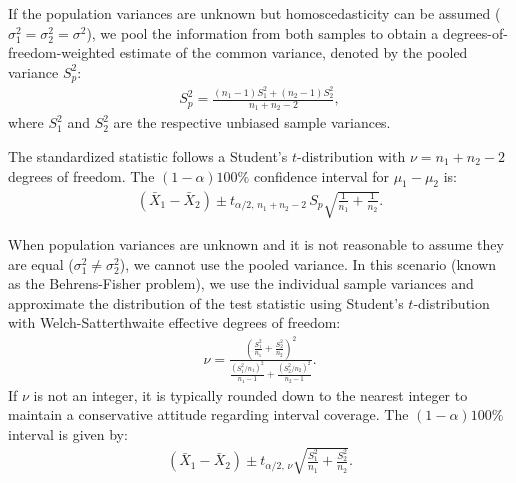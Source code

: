 \begin{teorema}
	If the population variances are unknown but homoscedasticity can be assumed ($\sigma_1^2 = \sigma_2^2 = \sigma^2$), we pool the information from both samples to obtain a degrees-of-freedom-weighted estimate of the common variance, denoted by the pooled variance $S_p^2$:
	\begin{align}
		S_p^2 = \frac{(n_1 - 1)S_1^2 + (n_2 - 1)S_2^2}{n_1 + n_2 - 2},
		\label{eq:varianza_combinada}
	\end{align}
	where $S_1^2$ and $S_2^2$ are the respective unbiased sample variances. 
	
	The standardized statistic follows a Student's $t$-distribution with $\nu = n_1 + n_2 - 2$ degrees of freedom. The $(1-\alpha)100\%$ confidence interval for $\mu_1 - \mu_2$ is:
	\begin{align}
		(\bar{X}_1 - \bar{X}_2) \pm t_{\alpha/2, \, n_1+n_2-2} \, S_p \sqrt{\frac{1}{n_1} + \frac{1}{n_2}}.
	\end{align}
\end{teorema}

\begin{teorema}
	When population variances are unknown and it is not reasonable to assume they are equal ($\sigma_1^2 \neq \sigma_2^2$), we cannot use the pooled variance. In this scenario (known as the Behrens-Fisher problem), we use the individual sample variances and approximate the distribution of the test statistic using Student's $t$-distribution with Welch-Satterthwaite effective degrees of freedom:
	\begin{align}
		\nu = \frac{\left( \frac{S_1^2}{n_1} + \frac{S_2^2}{n_2} \right)^2}{\frac{\left(S_1^2 / n_1\right)^2}{n_1 - 1} + \frac{\left(S_2^2 / n_2\right)^2}{n_2 - 1}}.
		\label{eq:df_welch}
	\end{align}
	If $\nu$ is not an integer, it is typically rounded down to the nearest integer to maintain a conservative attitude regarding interval coverage. The $(1-\alpha)100\%$ interval is given by:
	\begin{align}
		(\bar{X}_1 - \bar{X}_2) \pm t_{\alpha/2, \, \nu} \sqrt{\frac{S_1^2}{n_1} + \frac{S_2^2}{n_2}}.
	\end{align}
\end{teorema}

